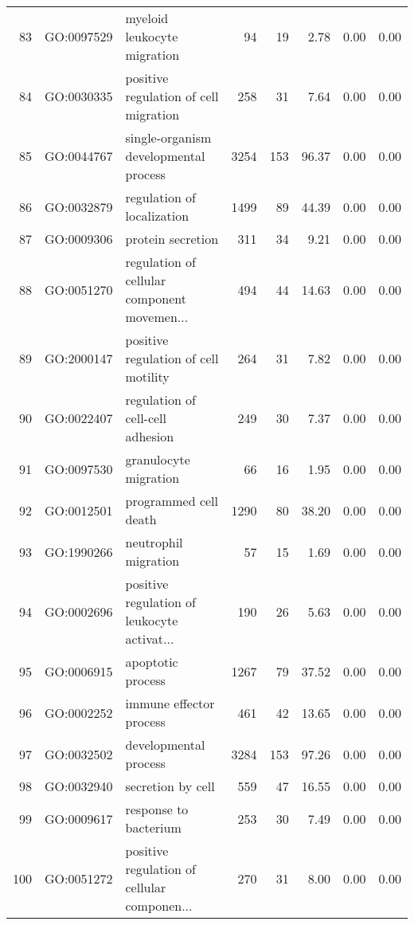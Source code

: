\begin{table}[ht]
\begin{tabular}{rllrrrrr}
  83 & GO:0097529 & myeloid leukocyte migration &  94 &  19 & 2.78 & 0.00 & 0.00 \\ 
  84 & GO:0030335 & positive regulation of cell migration & 258 &  31 & 7.64 & 0.00 & 0.00 \\ 
  85 & GO:0044767 & single-organism developmental process & 3254 & 153 & 96.37 & 0.00 & 0.00 \\ 
  86 & GO:0032879 & regulation of localization & 1499 &  89 & 44.39 & 0.00 & 0.00 \\ 
  87 & GO:0009306 & protein secretion & 311 &  34 & 9.21 & 0.00 & 0.00 \\ 
  88 & GO:0051270 & regulation of cellular component movemen... & 494 &  44 & 14.63 & 0.00 & 0.00 \\ 
  89 & GO:2000147 & positive regulation of cell motility & 264 &  31 & 7.82 & 0.00 & 0.00 \\ 
  90 & GO:0022407 & regulation of cell-cell adhesion & 249 &  30 & 7.37 & 0.00 & 0.00 \\ 
  91 & GO:0097530 & granulocyte migration &  66 &  16 & 1.95 & 0.00 & 0.00 \\ 
  92 & GO:0012501 & programmed cell death & 1290 &  80 & 38.20 & 0.00 & 0.00 \\ 
  93 & GO:1990266 & neutrophil migration &  57 &  15 & 1.69 & 0.00 & 0.00 \\ 
  94 & GO:0002696 & positive regulation of leukocyte activat... & 190 &  26 & 5.63 & 0.00 & 0.00 \\ 
  95 & GO:0006915 & apoptotic process & 1267 &  79 & 37.52 & 0.00 & 0.00 \\ 
  96 & GO:0002252 & immune effector process & 461 &  42 & 13.65 & 0.00 & 0.00 \\ 
  97 & GO:0032502 & developmental process & 3284 & 153 & 97.26 & 0.00 & 0.00 \\ 
  98 & GO:0032940 & secretion by cell & 559 &  47 & 16.55 & 0.00 & 0.00 \\ 
  99 & GO:0009617 & response to bacterium & 253 &  30 & 7.49 & 0.00 & 0.00 \\ 
  100 & GO:0051272 & positive regulation of cellular componen... & 270 &  31 & 8.00 & 0.00 & 0.00 \\ 
   \hline
\end{tabular}
\end{table}
